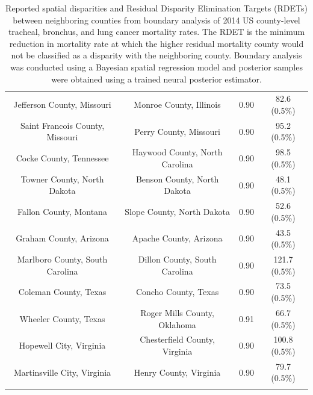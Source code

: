 \begin{longtable}{cccc}
  Jefferson County, Missouri & Monroe County, Illinois & 0.90 & 82.6 (0.5\%) \\ 
  Saint Francois County, Missouri & Perry County, Missouri & 0.90 & 95.2 (0.5\%) \\ 
  Cocke County, Tennessee & Haywood County, North Carolina & 0.90 & 98.5 (0.5\%) \\ 
  Towner County, North Dakota & Benson County, North Dakota & 0.90 & 48.1 (0.5\%) \\ 
  Fallon County, Montana & Slope County, North Dakota & 0.90 & 52.6 (0.5\%) \\ 
  Graham County, Arizona & Apache County, Arizona & 0.90 & 43.5 (0.5\%) \\ 
  Marlboro County, South Carolina & Dillon County, South Carolina & 0.90 & 121.7 (0.5\%) \\ 
  Coleman County, Texas & Concho County, Texas & 0.90 & 73.5 (0.5\%) \\ 
  Wheeler County, Texas & Roger Mills County, Oklahoma & 0.91 & 66.7 (0.5\%) \\ 
  Hopewell City, Virginia & Chesterfield County, Virginia & 0.90 & 100.8 (0.5\%) \\ 
  Martinsville City, Virginia & Henry County, Virginia & 0.90 & 79.7 (0.5\%) \\ 
   \bottomrule
\caption{Reported spatial disparities and Residual Disparity Elimination Targets (RDETs) between neighboring counties from boundary analysis of 2014 US county-level tracheal, bronchus, and lung cancer mortality rates. The RDET is the minimum reduction in mortality rate at which the higher residual mortality county would not be classified as a disparity with the neighboring county. Boundary analysis was conducted using a Bayesian spatial regression model and posterior samples were obtained using a trained neural posterior estimator.} 
\label{tab:full_disparity_table}
\end{longtable}
